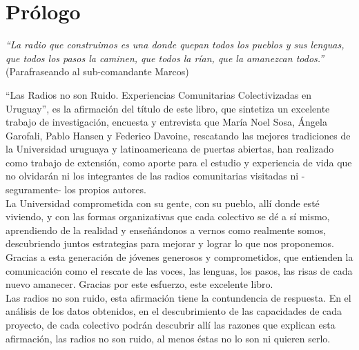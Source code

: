 {}
\chapter*{Prólogo}
\begin{flushright}
\begin{small}
  \textit{``La radio que construimos es una donde quepan todos los pueblos y sus lenguas, que todos los pasos la caminen, que todos la rían, que la amanezcan todos.''}\\
(Parafraseando al sub-comandante Marcos)\end{small}
\end{flushright}

\vspace*{1cm}
``Las Radios no son Ruido. Experiencias Comunitarias Colectivizadas en Uruguay'', es la afirmación del título de este libro, que sintetiza un excelente trabajo de investigación, encuesta y entrevista que María Noel Sosa, Ángela Garofali, Pablo Hansen y Federico Davoine, rescatando las mejores tradiciones de la Universidad uruguaya y latinoamericana de puertas abiertas, han realizado como trabajo de extensión, como aporte para el estudio y experiencia de vida que no olvidarán ni los integrantes de las radios comunitarias visitadas ni -seguramente- los propios autores.\\

La Universidad comprometida con su gente, con su pueblo, allí donde esté viviendo, y con las formas organizativas que cada colectivo se dé a sí mismo, aprendiendo de la realidad y enseñándonos a vernos como realmente somos, descubriendo juntos estrategias para mejorar y lograr lo que nos proponemos.\\

Gracias a esta generación de jóvenes generosos y comprometidos, que entienden la comunicación como el rescate de las voces, las lenguas, los pasos, las risas de cada nuevo amanecer. Gracias por este esfuerzo, este excelente libro.\\

Las radios no son ruido, esta afirmación tiene la contundencia de respuesta. En el análisis de los datos obtenidos, en el descubrimiento de las capacidades de cada proyecto, de cada colectivo podrán descubrir allí las razones que explican esta afirmación, las radios no son ruido, al menos éstas no lo son ni quieren serlo.\\

